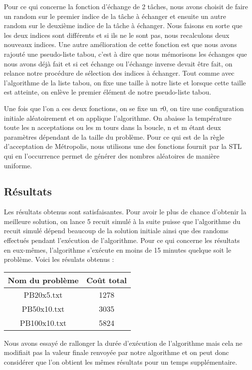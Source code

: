 \documentclass{report}
\begin{document}
Pour ce qui concerne la fonction d'échange de 2 tâches, nous avons choisit de faire un random sur le premier indice de la tâche à échanger et ensuite un autre random sur le deuxième indice de la tâche à échanger. Nous faisons en sorte que les deux indices sont différents et si ils ne le sont pas, nous recalculons deux nouveaux indices. Une autre amélioration de cette fonction est que nous avons rajouté une pseudo-liste tabou, c'est à dire que nous mémorisons les échanges que nous avons déjà fait et si cet échange ou l'échange inverse devait être fait, on relance notre procédure de sélection des indices à échanger. Tout comme avec l'algorithme de la liste tabou, on fixe une taille à notre liste et lorsque cette taille est atteinte, on enlève le premier élément de notre pseudo-liste tabou.

Une fois que l'on a ces deux fonctions, on se fixe un $\tau 0$, on tire une configuration initiale aléatoirement et on applique l'algorithme. On abaisse la température toute les n acceptations ou les m tours dans la boucle, n et m étant deux paramètres dépendant de la taille du problème. Pour ce qui est de la règle d'acceptation de Métropolis, nous utilisons une des fonctions fournit par la STL qui en l'occurrence permet de générer des nombres aléatoires de manière uniforme.

\subsection{Résultats}
Les résultats obtenus sont satisfaisantes. Pour avoir le plus de chance d'obtenir la meilleure solution, on lance 5 recuit simulé à la suite puisse que l'algorithme du recuit simulé dépend beaucoup de la solution initiale ainsi que des randoms effectués pendant l'exécution de l'algorithme. Pour ce qui concerne les résultats en eux-mêmes, l'algorithme s'exécute en moins de 15 minutes quelque soit le problème. Voici les résulats obtenus :\\
\begin{tabular}{|c|c|}
	\hline
	Nom du problème & Coût total\\
	\hline	
	PB20x5.txt & 1278 \\
	PB50x10.txt & 3035 \\
	PB100x10.txt & 5824 \\
	\hline
\end{tabular}

Nous avons essayé de rallonger la durée d'exécution de l'algorithme mais cela ne modifiait pas la valeur finale renvoyée par notre algorithme et on peut donc considérer que l'on obtient les mêmes résultats pour un temps supplémentaire.
\end{document}
